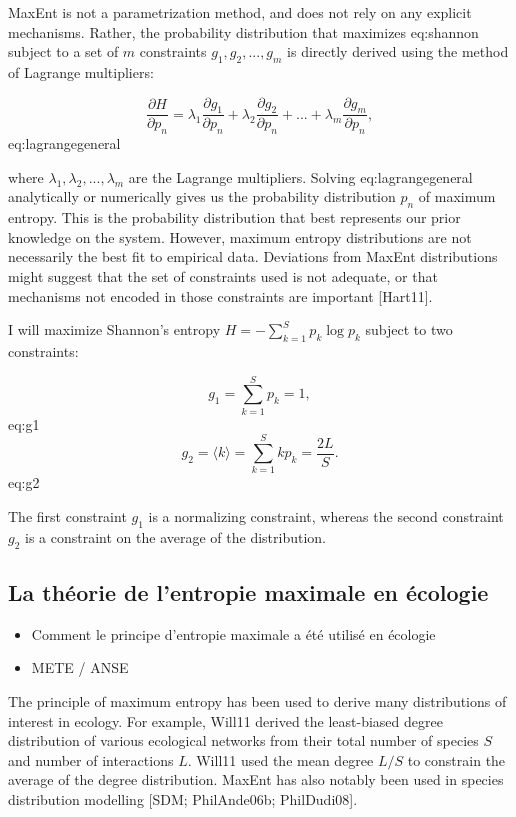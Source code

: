 MaxEnt is not a parametrization method, and does not rely on any explicit
mechanisms. Rather, the probability distribution that maximizes eq:shannon
subject to a set of $m$ constraints {$g_1, g_2, ..., g_m$} is directly derived
using the method of Lagrange multipliers:

$$\frac{\partial H}{\partial p_n} = \lambda_1 \frac{\partial g_1}{\partial p_n}
+ \lambda_2 \frac{\partial g_2}{\partial p_n}+...+ \lambda_m \frac{\partial
g_m}{\partial p_n},$${eq:lagrangegeneral}

where {$\lambda_1, \lambda_2, ..., \lambda_m$} are the Lagrange multipliers.
Solving eq:lagrangegeneral analytically or numerically gives us the probability
distribution $p_n$ of maximum entropy. This is the probability distribution that
best represents our prior knowledge on the system. However, maximum entropy
distributions are not necessarily the best fit to empirical data. Deviations
from MaxEnt distributions might suggest that the set of constraints used is not
adequate, or that mechanisms not encoded in those constraints are important
[Hart11].

I will maximize Shannon's entropy $H=-\sum_{k=1}^{S} p_k \log p_k$ subject to
two constraints:

$$g_1 = \sum_{k=1}^{S} p_k = 1,$${eq:g1}
$$g_2 = \langle k \rangle = \sum_{k=1}^{S} k p_k = \frac{2L}{S}.$${eq:g2}

The first constraint $g_1$ is a normalizing constraint, whereas the second
constraint $g_2$ is a constraint on the average of the distribution. 

\subsection{La théorie de l'entropie maximale en écologie} 

\begin{itemize}
    \item Comment le principe d'entropie maximale a été utilisé en écologie
    \item METE / ANSE
\end{itemize}

The principle of maximum entropy has been used to derive many distributions of
interest in ecology. For example, Will11 derived the least-biased degree
distribution of various ecological networks from their total number of species
$S$ and number of interactions $L$. Will11 used the mean degree $L/S$ to
constrain the average of the degree distribution. MaxEnt has also notably been
used in species distribution modelling [SDM; PhilAnde06b; PhilDudi08].

